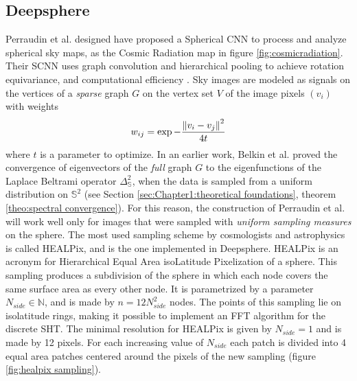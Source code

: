 \subsection{Deepsphere}\label{sec:Chapter1:DeepSphere}
Perraudin et al. designed have proposed a Spherical CNN to process and analyze spherical sky maps, as the Cosmic Radiation map in figure \ref{fig:cosmicradiation}. Their SCNN uses graph convolution and hierarchical pooling to achieve rotation equivariance, and computational efficiency \cite{DeepSphere}. Sky images are modeled as signals on the vertices of a \textit{sparse} graph $G$ on the vertex set $V$ of the image pixels $(v_i)$ with weights
$$
w_{ij}=\exp -\frac{\left\lVert v_i-v_j\right\rVert^2}{4t}
$$
where $t$ is a parameter to optimize. In an earlier work, Belkin et al. \cite{NIPS2006_2989} proved the convergence of eigenvectors of the \textit{full} graph $G$ to the eigenfunctions of the Laplace Beltrami operator $\Delta_\mathbb S^2$, when the data is sampled from a uniform distribution on $\mathbb S^2$ (see Section \ref{sec:Chapter1:theoretical foundations}, theorem \ref{theo:spectral convergence}). For this reason, the construction of Perraudin et al. will work well only for images that were sampled with \textit{uniform sampling measures} on the sphere. The most used sampling scheme by cosmologists and astrophysics is called HEALPix, and is the one implemented in Deepsphere. HEALPix is an acronym for Hierarchical Equal Area isoLatitude Pixelization of a sphere. This sampling produces a subdivision of the sphere in which each node covers the same surface area as every other node. It is parametrized by a parameter $N_{side}\in\mathbb N$, and is made by $n=12N_{side}^2$ nodes. The points of this sampling lie on isolatitude rings, making it possible to implement an FFT algorithm for the discrete SHT. The minimal resolution for HEALPix is given by $N_{side}=1$ and is made by 12 pixels. For each increasing value of $N_{side}$ each patch is divided into 4 equal area patches centered around the pixels of the new sampling (figure \ref{fig:healpix sampling}).

